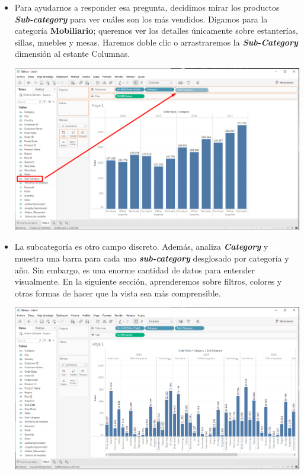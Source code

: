 \documentclass[12pt,letterpaper]{article}
\begin{document}
\begin{enumerate}
\begin{center}
        \end{center}
        \begin{itemize}
            \item Para ayudarnos a responder esa pregunta, decidimos mirar los productos \textit{\textbf{Sub-category}} para ver cuáles son los más vendidos. Digamos para la categoría \textbf{Mobiliario}; queremos ver los detalles únicamente sobre estanterías, sillas, muebles y mesas. Haremos doble clic o arrastraremos la \textit{\textbf{Sub-Category}} dimensión al estante Columnas.
            \begin{center}
                \includegraphics[width=15cm]{./img/img17.png}
            \end{center}
            \item La subcategoría es otro campo discreto. Además, analiza \textit{\textbf{Category}} y muestra una barra para cada uno \textit{\textbf{sub-category}} desglosado por categoría y año. Sin embargo, es una enorme cantidad de datos para entender visualmente. En la siguiente sección, aprenderemos sobre filtros, colores y otras formas de hacer que la vista sea más comprensible.
            \begin{center}
                \includegraphics[width=15cm]{./img/img18.png}
            \end{center}
        \end{itemize}
    \end{enumerate}
\end{document}
